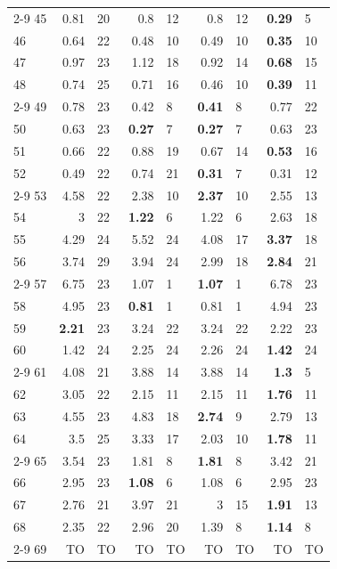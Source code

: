 \begin{longtable}{lr@{\hskip 4pt}l@{\hskip 12pt}r@{\hskip 4pt}l@{\hskip 12pt}r@{\hskip 4pt}l@{\hskip 12pt}r@{\hskip 4pt}l@{\hskip 12pt}}
\cmidrule{2-9}
45 & 0.81 & 20 & 0.8 & 12 & 0.8 & 12 & \textbf{0.29} & 5 \\
46 & 0.64 & 22 & 0.48 & 10 & 0.49 & 10 & \textbf{0.35} & 10 \\
47 & 0.97 & 23 & 1.12 & 18 & 0.92 & 14 & \textbf{0.68} & 15 \\
48 & 0.74 & 25 & 0.71 & 16 & 0.46 & 10 & \textbf{0.39} & 11 \\
\cmidrule{2-9}
49 & 0.78 & 23 & 0.42 & 8 & \textbf{0.41} & 8 & 0.77 & 22 \\
50 & 0.63 & 23 & \textbf{0.27} & 7 & \textbf{0.27} & 7 & 0.63 & 23 \\
51 & 0.66 & 22 & 0.88 & 19 & 0.67 & 14 & \textbf{0.53} & 16 \\
52 & 0.49 & 22 & 0.74 & 21 & \textbf{0.31} & 7 & 0.31 & 12 \\
\cmidrule{2-9}
53 & 4.58 & 22 & 2.38 & 10 & \textbf{2.37} & 10 & 2.55 & 13 \\
54 & 3 & 22 & \textbf{1.22} & 6 & 1.22 & 6 & 2.63 & 18 \\
55 & 4.29 & 24 & 5.52 & 24 & 4.08 & 17 & \textbf{3.37} & 18 \\
56 & 3.74 & 29 & 3.94 & 24 & 2.99 & 18 & \textbf{2.84} & 21 \\
\cmidrule{2-9}
57 & 6.75 & 23 & 1.07 & 1 & \textbf{1.07} & 1 & 6.78 & 23 \\
58 & 4.95 & 23 & \textbf{0.81} & 1 & 0.81 & 1 & 4.94 & 23 \\
59 & \textbf{2.21} & 23 & 3.24 & 22 & 3.24 & 22 & 2.22 & 23 \\
60 & 1.42 & 24 & 2.25 & 24 & 2.26 & 24 & \textbf{1.42} & 24 \\
\cmidrule{2-9}
61 & 4.08 & 21 & 3.88 & 14 & 3.88 & 14 & \textbf{1.3} & 5 \\
62 & 3.05 & 22 & 2.15 & 11 & 2.15 & 11 & \textbf{1.76} & 11 \\
63 & 4.55 & 23 & 4.83 & 18 & \textbf{2.74} & 9 & 2.79 & 13 \\
64 & 3.5 & 25 & 3.33 & 17 & 2.03 & 10 & \textbf{1.78} & 11 \\
\cmidrule{2-9}
65 & 3.54 & 23 & 1.81 & 8 & \textbf{1.81} & 8 & 3.42 & 21 \\
66 & 2.95 & 23 & \textbf{1.08} & 6 & 1.08 & 6 & 2.95 & 23 \\
67 & 2.76 & 21 & 3.97 & 21 & 3 & 15 & \textbf{1.91} & 13 \\
68 & 2.35 & 22 & 2.96 & 20 & 1.39 & 8 & \textbf{1.14} & 8 \\
\cmidrule{2-9}
69 & TO & TO & TO & TO & TO & TO & TO & TO \\

\end{longtable}
